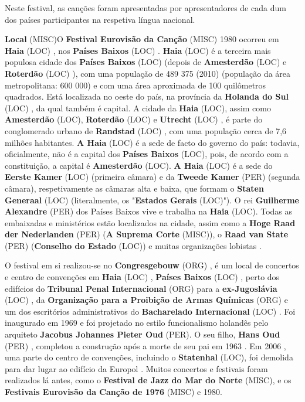 \documentclass[12pt,a4paper]{article}
\begin{document}
Neste festival, as canções foram apresentadas por apresentadores de cada dum dos países participantes na respetiva língua nacional.



\textbf{Local} (MISC)O \textbf{Festival Eurovisão da Canção} (MISC) 1980 ocorreu em \textbf{Haia} (LOC) , nos \textbf{Países Baixos} (LOC) . \textbf{Haia} (LOC) é a terceira mais populosa cidade dos \textbf{Países Baixos} (LOC) (depois de \textbf{Amesterdão} (LOC) e \textbf{Roterdão} (LOC) ), com uma população de 489 375 (2010) (população da área metropolitana: 600 000) e com uma área aproximada de 100 quilômetros quadrados. Está localizada no oeste do país, na província da \textbf{Holanda do Sul} (LOC) , da qual também é capital. A cidade da \textbf{Haia} (LOC), assim como \textbf{Amesterdão} (LOC), \textbf{Roterdão} (LOC) e \textbf{Utrecht} (LOC) , é parte do conglomerado urbano de \textbf{Randstad} (LOC) , com uma população cerca de 7,6 milhões habitantes. \textbf{A Haia} (LOC) é a sede de facto do governo do país: todavia, oficialmente, não é a capital dos \textbf{Países Baixos} (LOC), pois, de acordo com a constituição, a capital é \textbf{Amesterdão} (LOC). \textbf{A Haia} (LOC) é a sede do \textbf{Eerste Kamer} (LOC) (primeira câmara) e da \textbf{Tweede Kamer} (PER) (segunda câmara), respetivamente as câmaras alta e baixa, que formam o \textbf{Staten Generaal} (LOC) (literalmente, os "\textbf{Estados Gerais} (LOC)"). O rei \textbf{Guilherme Alexandre} (PER) dos Países Baixos vive e trabalha na \textbf{Haia} (LOC). Todas as embaixadas e ministérios estão localizados na cidade, assim como a \textbf{Hoge Raad der Nederlanden} (PER) (\textbf{A Suprema Corte} (MISC)), o \textbf{Raad van State} (PER) (\textbf{Conselho do Estado} (LOC)) e muitas organizações lobistas .

O festival em si realizou-se no \textbf{Congresgebouw} (ORG) , é um local de concertos e centro de convenções em \textbf{Haia} (LOC) , \textbf{Países Baixos} (LOC) , perto dos edifícios do \textbf{Tribunal Penal Internacional} (ORG) para a \textbf{ex-Jugoslávia} (LOC) , da \textbf{Organização para a Proibição de Armas Químicas} (ORG) e um dos escritórios administrativos do \textbf{Bacharelado Internacional} (LOC) . Foi inaugurado em 1969 e foi projetado no estilo funcionalismo holandês pelo arquiteto \textbf{Jacobus Johannes Pieter Oud} (PER). O seu filho, \textbf{Hans Oud} (PER) , completou a construção após a morte de seu pai em 1963 . Em 2006 , uma parte do centro de convenções, incluindo o \textbf{Statenhal} (LOC), foi demolida para dar lugar ao edifício da Europol . Muitos concertos e festivais foram realizados lá antes, como o \textbf{Festival de Jazz do Mar do Norte} (MISC), e os \textbf{Festivais Eurovisão da Canção de 1976} (MISC) e 1980.
\end{document}
